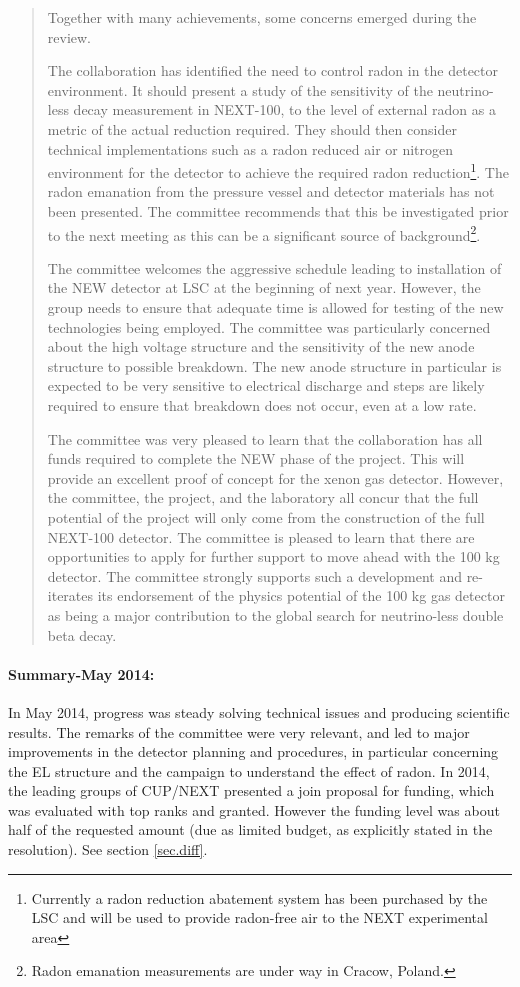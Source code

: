 \begin{quotation}
Together with many achievements, some concerns emerged during the review.
	 
The collaboration has identified the need to control radon in the detector environment. It should present a study of the sensitivity of the neutrino-less decay measurement in NEXT-100, to the level of external radon as a metric of the actual reduction required. They should then consider technical implementations such as a radon reduced air or nitrogen environment for the detector to achieve the required radon reduction\footnote{Currently a radon reduction abatement system has been purchased by the LSC and will be used to provide radon-free air to the NEXT experimental area}. 
The radon emanation from the pressure vessel and detector materials has not been presented. The committee recommends that this be investigated prior to the next meeting as this can be a significant source of background\footnote{Radon emanation measurements are under way in Cracow, Poland.}.
	 
The committee welcomes the aggressive schedule leading to installation of the NEW detector at LSC at the beginning of next year. However, the group needs to ensure that adequate time is allowed for testing of the new technologies being employed. The committee was particularly concerned about the high voltage structure and the sensitivity of the new anode structure to possible breakdown. The new anode structure in particular is expected to be very sensitive to electrical discharge and steps are likely required to ensure that breakdown does not occur, even at a low rate.

The committee was very pleased to learn that the collaboration has all funds required to complete the NEW phase of the project. This will provide an excellent proof of concept for the xenon gas detector. However, the committee, the project, and the laboratory all concur that the full potential of the project will only come from the construction of the full NEXT-100 detector. The committee is pleased to learn that there are opportunities to apply for further support to move ahead with the 100 kg detector. The committee strongly supports such a development and re-iterates its endorsement of the physics potential of the 100 kg gas detector as being a major contribution to the global search for neutrino-less double beta decay.


\end{quotation}

\paragraph{Summary-May 2014:} In May 2014, progress was steady solving technical issues and producing scientific results. The remarks of the committee were very relevant, and led to major improvements in the detector planning and procedures, in particular concerning the EL structure and the campaign to understand the effect of radon. In 2014, the leading groups of CUP/NEXT presented a join proposal for funding, which was evaluated with top ranks and granted. However the funding level was about half of the requested amount (due as limited budget, as explicitly stated in the resolution).  See section \ref{sec.diff}.

